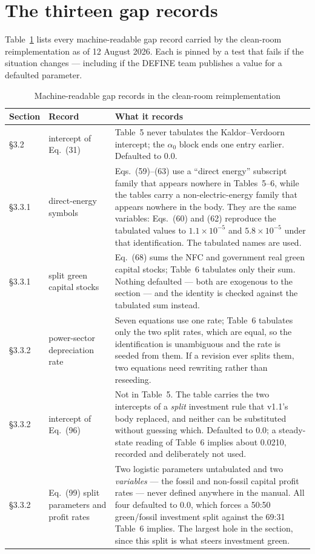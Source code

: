 \section{The thirteen gap records}
\label{app:gaps}

Table~\ref{tab:gaps} lists every machine-readable gap record carried by the clean-room reimplementation as of 12 August 2026. Each is pinned by a test that fails if the situation changes --- including if the DEFINE team publishes a value for a defaulted parameter.

\begin{table}[h]
\centering
\caption{Machine-readable gap records in the clean-room reimplementation}
\label{tab:gaps}
\scriptsize
\begin{tabularx}{\textwidth}{@{}llX@{}}
\toprule
Section & Record & What it records \\
\midrule
\S3.2 & intercept of Eq.~(31) & Table~5 never tabulates the Kaldor--Verdoorn intercept; the $\alpha_0$ block ends one entry earlier. Defaulted to 0.0. \\
\addlinespace
\S3.3.1 & direct-energy symbols & Eqs.~(59)--(63) use a ``direct energy'' subscript family that appears nowhere in Tables~5--6, while the tables carry a non-electric-energy family that appears nowhere in the body. They are the same variables: Eqs.~(60) and (62) reproduce the tabulated values to $1.1\times10^{-5}$ and $5.8\times10^{-5}$ under that identification. The tabulated names are used. \\
\S3.3.1 & split green capital stocks & Eq.~(68) sums the NFC and government real green capital stocks; Table~6 tabulates only their sum. Nothing defaulted --- both are exogenous to the section --- and the identity is checked against the tabulated sum instead. \\
\addlinespace
\S3.3.2 & power-sector depreciation rate & Seven equations use one rate; Table~6 tabulates only the two split rates, which are equal, so the identification is unambiguous and the rate is seeded from them. If a revision ever splits them, two equations need rewriting rather than reseeding. \\
\S3.3.2 & intercept of Eq.~(96) & Not in Table~5. The table carries the two intercepts of a \emph{split} investment rule that v1.1's body replaced, and neither can be substituted without guessing which. Defaulted to 0.0; a steady-state reading of Table~6 implies about 0.0210, recorded and deliberately not used. \\
\S3.3.2 & Eq.~(99) split parameters and profit rates & Two logistic parameters untabulated and two \emph{variables} --- the fossil and non-fossil capital profit rates --- never defined anywhere in the manual. All four defaulted to 0.0, which forces a 50:50 green/fossil investment split against the 69:31 Table~6 implies. The largest hole in the section, since this split is what steers investment green. \\

\end{tabularx}
\end{table}
